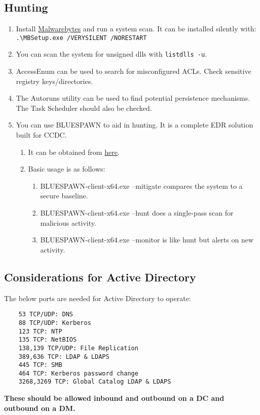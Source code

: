 \documentclass[12pt,letterpaper]{article}
\def\code#1{\textcolor{c2}{\texttt{#1}}}
\def\bf#1{\textbf{#1}}
\begin{document}
\subsection{Hunting}

\begin{enumerate}
	\item Install \href{https://downloads.malwarebytes.com/file/mb-windows}{Malwarebytes} and run a system scan. It can be installed silently with: \\
		\code{.\textbackslash{}MBSetup.exe /VERYSILENT /NORESTART}
	\item You can scan the system for unsigned dlls with \code{listdlls -u}.
	\item AccessEnum can be used to search for misconfigured ACLs. Check sensitive registry keys/directories.
	\item The Autoruns utility can be used to find potential persistence mechanisms. The Task Scheduler should also be checked.
	\item You can use BLUESPAWN to aid in hunting. It is a complete EDR solution built for CCDC.
	\begin{enumerate}
		\item It can be obtained from \href{https://github.com/ION28/BLUESPAWN/releases/download/v0.5.1-alpha/BLUESPAWN-client-x64.exe}{here}.
		\item Basic usage is as follows:
		\begin{enumerate}
			\item BLUESPAWN-client-x64.exe --mitigate compares the system to a secure baseline.
			\item BLUESPAWN-client-x64.exe --hunt does a single-pass scan for malicious activity.
			\item BLUESPAWN-client-x64.exe --monitor is like hunt but alerts on new activity.
		\end{enumerate}
	\end{enumerate}
\end{enumerate}

\pagebreak

\subsection{Considerations for Active Directory}

The below ports are needed for Active Directory to operate:
\begin{verbatim}
	53 TCP/UDP: DNS
	88 TCP/UDP: Kerberos
	123 TCP: NTP
	135 TCP: NetBIOS
	138,139 TCP/UDP: File Replication
	389,636 TCP: LDAP & LDAPS
	445 TCP: SMB
	464 TCP: Kerberos password change
	3268,3269 TCP: Global Catalog LDAP & LDAPS
\end{verbatim}
\bf{These should be allowed inbound and outbound on a DC and outbound on a DM.}
\end{document}
